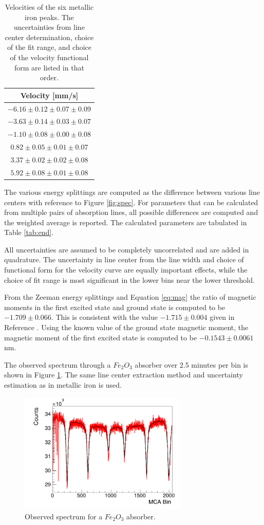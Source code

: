\begin{table}[h]
\caption{\label{table:vel} Velocities of the six metallic iron peaks. The uncertainties from line center determination, choice of the fit range, and choice of the velocity functional form are listed in that order. }
\begin{tabular}{|c|}
\hline
Velocity [mm/s] \\
\hline
$-6.16 \pm 0.12 \pm 0.07 \pm 0.09$ \\
\hline
$-3.63 \pm 0.14 \pm 0.03 \pm 0.07$ \\
\hline
$-1.10 \pm 0.08 \pm 0.00 \pm 0.08$ \\
\hline
$0.82 \pm 0.05 \pm 0.01 \pm 0.07$ \\
\hline
$3.37 \pm 0.02 \pm 0.02 \pm 0.08$ \\
\hline
$5.92 \pm 0.08 \pm 0.01 \pm 0.08$ \\
\hline
\end{tabular}
\end{table}

The various energy splittings are computed as the difference between various line centers with reference to Figure \ref{fig:spec}. For parameters that can be calculated from multiple pairs of absorption lines, all possible differences are computed and the weighted average is reported. The calculated parameters are tabulated in Table \ref{tab:end}.

All uncertainties are assumed to be completely uncorrelated and are added in quadrature. The uncertainty in line center from the line width and choice of functional form for the velocity curve are equally important effects, while the choice of fit range is most significant in the lower bins near the lower threshold. 

From the Zeeman energy splittings and Equation \ref{eq:mag} the ratio of magnetic moments in the first excited state and ground state is computed to be $-1.709\pm0.066$. This is consistent with the value $-1.715\pm0.004$ given in Reference \cite{preston}. Using the known value of the ground state magnetic moment, the magnetic moment of the first excited state is computed to be $-0.1543 \pm0.0061$ nm.

The observed spectrum through a $Fe_2O_3$ absorber over 2.5 minutes per bin is shown in Figure \ref{fig:fe2o3}. The same line center extraction method and uncertainty estimation as in metallic iron is used. 
 
\begin{figure}[htb]
\includegraphics[width=8cm]{fe2o3_peaks.png}
\caption{Observed spectrum for a $Fe_2O_3$ absorber.}
\label{fig:fe2o3}
\end{figure}

